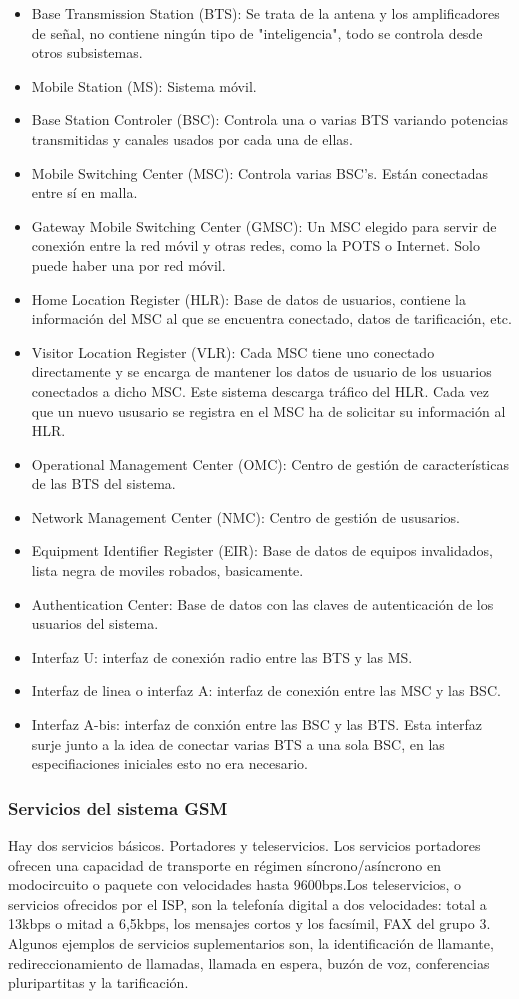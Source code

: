 \begin{itemize}
	\item Base Transmission Station (BTS): Se trata de la antena y los amplificadores de señal, no contiene ningún tipo de "inteligencia", todo se controla desde otros subsistemas.
	\item Mobile Station (MS): Sistema móvil.
	\item Base Station Controler (BSC): Controla una o varias BTS variando potencias transmitidas y canales usados por cada una de ellas.
	\item Mobile Switching Center (MSC): Controla varias BSC's. Están conectadas entre sí en malla.
	\item Gateway Mobile Switching Center (GMSC): Un MSC elegido para servir de conexión entre la red móvil y otras redes, como la POTS o Internet. Solo puede haber una por red móvil.
	\item Home Location Register (HLR): Base de datos de usuarios, contiene la información del MSC al que se encuentra conectado, datos de tarificación, etc.
	\item Visitor Location Register (VLR): Cada MSC tiene uno conectado directamente y se encarga de mantener los datos de usuario de los usuarios conectados a dicho MSC. Este sistema descarga tráfico del HLR. Cada vez que un nuevo ususario se registra en el MSC ha de solicitar su información al HLR.
	\item Operational Management Center (OMC): Centro de gestión de características de las BTS  del sistema.
	\item Network Management Center (NMC): Centro de gestión de ususarios.
	\item Equipment Identifier Register (EIR): Base de datos de equipos invalidados, lista negra de moviles robados, basicamente.
	\item Authentication Center: Base de datos con las claves de autenticación de los usuarios del sistema.
	\item Interfaz U: interfaz de conexión radio entre las BTS y las MS.
	\item Interfaz de linea o interfaz A: interfaz de conexión entre las MSC y las BSC.
	\item Interfaz A-bis: interfaz de conxión entre las BSC y las BTS. Esta interfaz surje junto a la idea de conectar varias BTS a una sola BSC, en las especifiaciones iniciales esto no era necesario.
\end{itemize}
\subsubsection{Servicios del sistema GSM}
\label{ssub:serviciosGSM}
Hay dos servicios básicos. Portadores y teleservicios. Los servicios portadores ofrecen una capacidad de transporte en régimen síncrono/asíncrono en modocircuito o paquete con velocidades hasta 9600bps.Los teleservicios, o servicios ofrecidos por el ISP, son la telefonía digital a dos velocidades: total a 13kbps o mitad a 6,5kbps, los mensajes cortos y los facsímil, FAX del grupo 3. Algunos ejemplos de servicios suplementarios son, la identificación de llamante, redireccionamiento de llamadas, llamada en espera, buzón de voz, conferencias pluripartitas y la tarificación.
